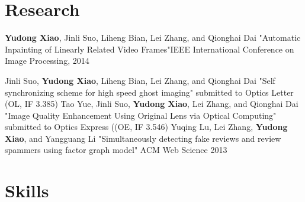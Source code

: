 \documentclass[11pt,a4paper]{moderncv}
\begin{document}
\section{Research}

{\textbf{Yudong Xiao}\textnormal{, Jinli Suo, Liheng Bian, Lei Zhang, and Qionghai Dai}}
{"Automatic Inpainting of Linearly Related Video Frames"}{IEEE International Conference on Image Processing, 2014}
{}{}{}

{\textnormal{Jinli Suo, }\textbf{Yudong Xiao}\textnormal{, Liheng Bian, Lei Zhang, and Qionghai Dai}}
{"Self synchronizing scheme for high speed ghost imaging"}
{submitted to Optics Letter (OL, IF 3.385)}
{}{}{}
{\textnormal{Tao Yue, Jinli Suo, }\textbf{Yudong Xiao}\textnormal{, Lei Zhang, and Qionghai Dai}}
{"Image Quality Enhancement Using Original Lens via Optical Computing"}
{submitted to  Optics Express ((OE, IF 3.546)}
{}{}{}
{\textnormal{Yuqing Lu, Lei Zhang, }\textbf{Yudong Xiao}\textnormal{, and Yangguang Li}}
{"Simultaneously detecting fake reviews and review spammers using factor graph model"}
{ACM Web Science 2013}
{}{}{}

\section{Skills}



\end{document}
